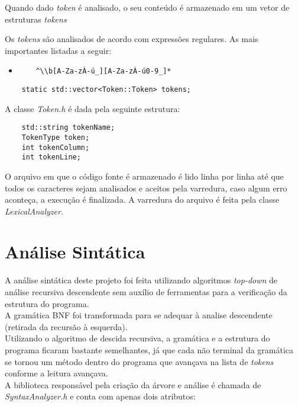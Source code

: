 \documentclass[12pt,a4paper,final]{article}
\begin{document}
Quando dado \textit{token} é analisado, o seu conteúdo é armazenado em um vetor de estruturas \textit{tokens}

Os \textit{tokens} são analisados de acordo com expressões regulares. As mais importantes listadas a seguir:

\begin{itemize}
\item 
\begin{lstlisting}
	^\\b[A-Za-zÀ-ú_][A-Za-zÀ-ú0-9_]*
\end{lstlisting}

\end{itemize}

\begin{lstlisting}
	static std::vector<Token::Token> tokens;
\end{lstlisting}

A classe \textit{Token.h} é dada pela seguinte estrutura:

\begin{lstlisting}
	std::string tokenName;
	TokenType token;
	int tokenColumn;
	int tokenLine;
\end{lstlisting}

O arquivo em que o código fonte é armazenado é lido linha por linha até que todos os caracteres sejam analisados e aceitos pela varredura, caso algum erro aconteça, a execução é finalizada.
A varredura do arquivo é feita pela classe \textit{LexicalAnalyzer}.

\section*{Análise Sintática}
A análise sintática deste projeto foi feita utilizando algoritmos \textit{top-down} de análise recursiva descendente sem auxílio de ferramentas para a verificação da estrutura do programa.\\
A gramática BNF foi transformada para se adequar à analise descendente (retirada da recursão à esquerda).\\
Utilizando o algoritmo de descida recursiva, a gramática e a estrutura do programa ficaram bastante semelhantes, já que cada não terminal da gramática se tornou um método dentro do programa que avançava na lista de \textit{tokens} conforme a leitura avançava.\\

A biblioteca responsável pela criação da árvore e análise é chamada de \textit{SyntaxAnalyzer.h} e  conta com apenas dois atributos:
\end{document}
